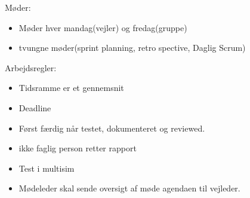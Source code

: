 \documentclass[12pt]{article}
\begin{document}
\begin{itemize}
Møder:

\begin{itemize}
	\item Møder hver mandag(vejler) og fredag(gruppe)
	\item tvungne møder(sprint planning, retro spective, Daglig Scrum)
\end{itemize}

Arbejdsregler:

\begin{itemize}
	\item Tidsramme er et gennemsnit
	\item Deadline
	\item Først færdig når testet, dokumenteret og reviewed.
	\item ikke faglig person retter rapport
	\item  Test i multisim
	\item Mødeleder skal sende oversigt af møde agendaen til vejleder.
\end{itemize}
\end{itemize}
\end{document}
